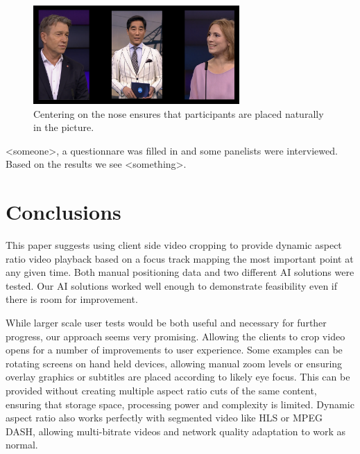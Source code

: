 \documentclass[sigconf, review=false]{acmart}
\begin{document}
\begin{figure}
\begin{center}
\includegraphics[width=0.7\textwidth]{nose_center.png}
\caption{Centering on the nose ensures that participants are placed naturally
 in the picture.}
\label{nose_center}
\end{center}
\end{figure}

   <someone>, a questionnare was filled in and some panelists were
   interviewed. Based on the results we see <something>.


\section{Conclusions}

This paper suggests using client side video cropping to provide dynamic aspect
ratio video playback based on a focus track mapping the most important point
at any given time. Both manual positioning data and two different AI
solutions were tested. Our AI solutions worked well enough to demonstrate
feasibility even if there is room for improvement.

While larger scale user tests would be both useful and necessary for further
progress, our approach seems very promising. Allowing the clients to crop
video opens for a number of improvements to user experience. Some examples
can be rotating screens on hand held devices, allowing manual zoom levels or
ensuring overlay graphics or subtitles are placed according to likely eye
focus. This can be provided without creating multiple aspect ratio cuts of
the same content, ensuring that storage space, processing power and
complexity is limited. Dynamic aspect ratio also works perfectly with
segmented video like HLS or MPEG DASH, allowing multi-bitrate videos and
network quality adaptation to work as normal. 
\end{document}
